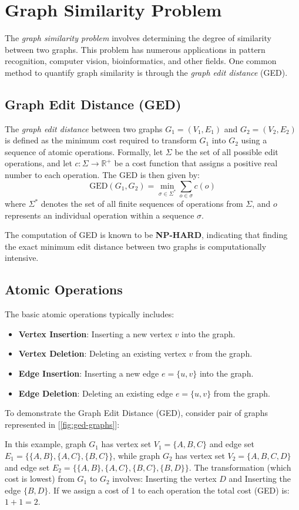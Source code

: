 \documentclass[../Thesis.tex]{subfiles}
\begin{document}
\section{Graph Similarity Problem}
\label{sec:graph_similarity_problem}
The \emph{graph similarity problem} involves determining the degree of similarity between two graphs. This problem has numerous applications in pattern recognition, computer vision, bioinformatics, and other fields. One common method to quantify graph similarity is through the \emph{graph edit distance} (GED).

\subsection{Graph Edit Distance (GED)}
The \emph{graph edit distance} between two graphs $G_1 = (V_1, E_1)$ and $G_2 = (V_2, E_2)$ is defined as the minimum cost required to transform $G_1$ into $G_2$ using a sequence of atomic operations. Formally, let $\Sigma$ be the set of all possible edit operations, and let $c: \Sigma \to \mathbb{R}^+$ be a cost function that assigns a positive real number to each operation. The GED is then given by:
\[
\text{GED}(G_1, G_2) = \min_{\sigma \in \Sigma^*} \sum_{o \in \sigma} c(o)
\]
where $\Sigma^*$ denotes the set of all finite sequences of operations from $\Sigma$, and $o$ represents an individual operation within a sequence $\sigma$.

The computation of GED is known to be \textbf{NP-HARD}, indicating that finding the exact minimum edit distance between two graphs is computationally intensive.

\subsection{Atomic Operations}
The basic atomic operations typically includes:
\begin{itemize}
    \item \textbf{Vertex Insertion}: Inserting a new vertex $v$ into the graph.
    \item \textbf{Vertex Deletion}: Deleting an existing vertex $v$ from the graph.
    \item \textbf{Edge Insertion}: Inserting a new edge $e = \{u, v\}$ into the graph.
    \item \textbf{Edge Deletion}: Deleting an existing edge $e = \{u, v\}$ from the graph.
\end{itemize}
To demonstrate the Graph Edit Distance (GED), consider pair of graphs represented in [\autoref{fig:ged-graphs}]:

In this example, graph $G_1$ has vertex set $V_1 = \{A, B, C\}$ and edge set $E_1 = \{\{A, B\}, \{A, C\}, \{B, C\}\}$, while graph $G_2$ has vertex set $V_2 = \{A, B, C, D\}$ and edge set $E_2 = \{\{A, B\}, \{A, C\}, \{B, C\}, \{B, D\}\}$. The transformation (which cost is lowest) from $G_1$ to $G_2$ involves: Inserting the vertex $D$ and Inserting the edge $\{B, D\}$. If we assign a cost of 1 to each operation the total cost (GED) is: $1+1=2$.
\end{document}
